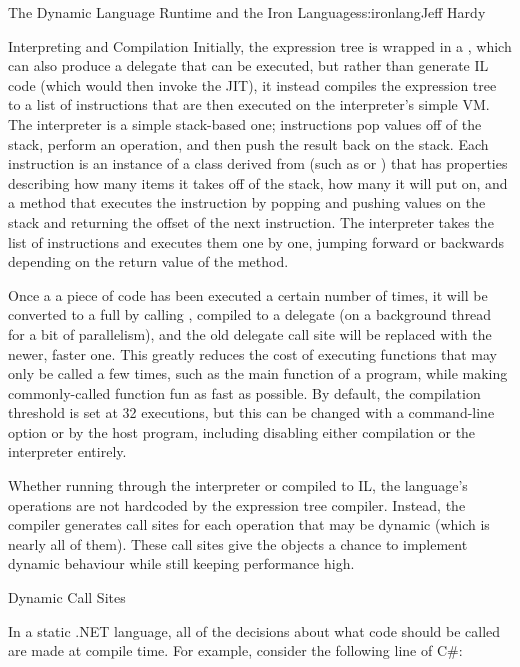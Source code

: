 \begin{aosachapter}{The Dynamic Language Runtime and the Iron Languages}{s:ironlang}{Jeff Hardy}
\begin{aosasect1}{Interpreting and Compilation}
Initially, the expression tree is wrapped in a ,
which can also produce a delegate that can be executed, but rather than
generate IL code (which would then invoke the JIT), it instead compiles the
expression tree to a list of instructions that are then executed on the
interpreter's simple VM. The interpreter is a simple stack-based one;
instructions pop values off of the stack, perform an operation, and then push
the result back on the stack. Each instruction is an instance of a class
derived from  (such as
 or ) that has properties
describing how many items it takes off of the stack, how many it will put on,
and a  method that executes the instruction by popping and pushing
values on the stack and returning the offset of the next instruction. The
interpreter takes the list of instructions and executes them one by one,
jumping forward or backwards depending on the return value of the 
method.

Once a a piece of code has been executed a certain number of times, it will be
converted to a full  by calling
, compiled to a 
delegate (on a background thread for a bit of parallelism), and the old
delegate call site will be replaced with the newer, faster one. This greatly
reduces the cost of executing functions that may only be called a few times,
such as the main function of a program, while making commonly-called function
fun as fast as possible. By default, the compilation threshold is set at 32
executions, but this can be changed with a command-line option or by the host
program, including disabling either compilation or the interpreter entirely.

Whether running through the interpreter or compiled to IL, the language's
operations are not hardcoded by the expression tree compiler. Instead, the
compiler generates call sites for each operation that may be dynamic (which is
nearly all of them). These call sites give the objects a chance to implement
dynamic behaviour while still keeping performance high.

\end{aosasect1}

\begin{aosasect1}{Dynamic Call Sites}

In a static .NET language, all of the decisions about what code should be
called are made at compile time. For example, consider the following line of
C\#:


\end{aosasect1}
\end{aosachapter}
